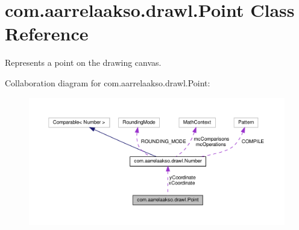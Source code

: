 \hypertarget{classcom_1_1aarrelaakso_1_1drawl_1_1_point}{}\section{com.\+aarrelaakso.\+drawl.\+Point Class Reference}
\label{classcom_1_1aarrelaakso_1_1drawl_1_1_point}


Represents a point on the drawing canvas.  




Collaboration diagram for com.\+aarrelaakso.\+drawl.\+Point\+:\nopagebreak
\begin{figure}[H]
\begin{center}
\leavevmode
\includegraphics[width=350pt]{d8/d8b/classcom_1_1aarrelaakso_1_1drawl_1_1_point__coll__graph}
\end{center}
\end{figure}
